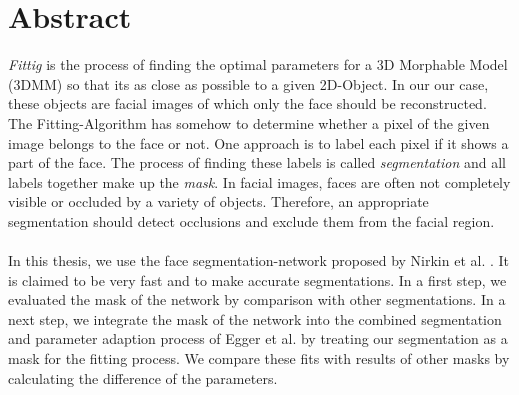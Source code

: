 \chapter{Abstract}
\textit{Fittig} is the process of finding the optimal parameters for a 3D Morphable Model (3DMM) so that its as close as possible to a given 2D-Object. In our our case, these objects are facial images of which only the face should be reconstructed. The Fitting-Algorithm has somehow to determine whether a pixel of the given image belongs to the face or not. One approach is to label each pixel if it shows a part of the face. The process of finding these labels is called \textit{segmentation} and all labels together make up the \textit{mask}. In facial images, faces are often not completely visible or occluded by a variety of objects. Therefore, an appropriate segmentation should detect occlusions and exclude them from the facial region.\\
\\
In this thesis, we use the face segmentation-network proposed by Nirkin et al. \cite{nirkin2018_faceswap}. It is claimed to be very fast and to make accurate segmentations. In a first step, we evaluated the mask of the network by comparison with other segmentations. In a next step, we integrate the mask of the network into the combined segmentation and parameter adaption process of Egger et al. \cite{egger_paper} by treating our segmentation as a mask for the fitting process. We compare these fits with results of other masks by calculating the difference of the parameters.\\

